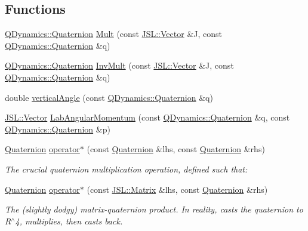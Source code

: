\subsection*{Functions}
\begin{DoxyCompactItemize}
\item 
\hyperlink{classQDynamics_1_1Quaternion}{Q\+Dynamics\+::\+Quaternion} \hyperlink{namespaceQDynamics_a0b043bd2021eaeb8b6580cef4fcc667c}{Mult} (const \hyperlink{classJSL_1_1Vector}{J\+S\+L\+::\+Vector} \&J, const \hyperlink{classQDynamics_1_1Quaternion}{Q\+Dynamics\+::\+Quaternion} \&q)
\item 
\hyperlink{classQDynamics_1_1Quaternion}{Q\+Dynamics\+::\+Quaternion} \hyperlink{namespaceQDynamics_a78137919461ac257fe032f870771b0ed}{Inv\+Mult} (const \hyperlink{classJSL_1_1Vector}{J\+S\+L\+::\+Vector} \&J, const \hyperlink{classQDynamics_1_1Quaternion}{Q\+Dynamics\+::\+Quaternion} \&q)
\item 
double \hyperlink{namespaceQDynamics_a003e8d43977a4b818a6e90993d00201a}{vertical\+Angle} (const \hyperlink{classQDynamics_1_1Quaternion}{Q\+Dynamics\+::\+Quaternion} \&q)
\item 
\hyperlink{classJSL_1_1Vector}{J\+S\+L\+::\+Vector} \hyperlink{namespaceQDynamics_a4eabde69f542fcca92f97b1ef2e28b33}{Lab\+Angular\+Momentum} (const \hyperlink{classQDynamics_1_1Quaternion}{Q\+Dynamics\+::\+Quaternion} \&q, const \hyperlink{classQDynamics_1_1Quaternion}{Q\+Dynamics\+::\+Quaternion} \&p)
\item 
\hyperlink{classQDynamics_1_1Quaternion}{Quaternion} \hyperlink{namespaceQDynamics_ac40010112506831ced816640def9bc85}{operator$\ast$} (const \hyperlink{classQDynamics_1_1Quaternion}{Quaternion} \&lhs, const \hyperlink{classQDynamics_1_1Quaternion}{Quaternion} \&rhs)
\begin{DoxyCompactList}\small\item\em The crucial quaternion multiplication operation, defined such that\+: \end{DoxyCompactList}\item 
\hyperlink{classQDynamics_1_1Quaternion}{Quaternion} \hyperlink{namespaceQDynamics_a3382c10ce708c163d79c9fdb5c79b452}{operator$\ast$} (const \hyperlink{classJSL_1_1Matrix}{J\+S\+L\+::\+Matrix} \&lhs, const \hyperlink{classQDynamics_1_1Quaternion}{Quaternion} \&rhs)
\begin{DoxyCompactList}\small\item\em The (slightly dodgy) matrix-\/quaternion product. In reality, casts the quaternion to R$^\wedge$4, multiplies, then casts back. \end{DoxyCompactList}\item 

\end{DoxyCompactItemize}

